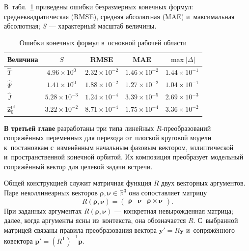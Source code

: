 В~табл.~\ref{tab:syn-main-errors} приведены ошибки безразмерных конечных формул: среднеквадратическая (RMSE), средняя абсолютная (MAE) и~максимальная абсолютная; $S$ --- характерный масштаб величины.

\begin{table}[htbp]
    \centering
    \caption{Ошибки конечных формул в~основной рабочей области}
    \label{tab:syn-main-errors}
    \small
    \begin{tabular}{@{}lcccc@{}}
        \toprule
        Величина & $S$ & RMSE & MAE & $\max|\Delta|$ \\
        \midrule
        $\widehat T$ & $4.96\!\times\!10^{0}$ & $2.32\!\times\!10^{-2}$ & $1.46\!\times\!10^{-2}$ & $1.44\!\times\!10^{-1}$ \\
        $\widehat\Psi$ & $1.41\!\times\!10^{0}$ & $1.88\!\times\!10^{-2}$ & $1.27\!\times\!10^{-2}$ & $1.04\!\times\!10^{-1}$ \\
        $\widehat J$ & $5.28\!\times\!10^{-3}$ & $1.24\!\times\!10^{-4}$ & $3.39\!\times\!10^{-5}$ & $2.69\!\times\!10^{-3}$ \\
        $\widehat{\mathbf z}_0^{\mathrm{pl}}$ & $3.22\!\times\!10^{-2}$ & $8.71\!\times\!10^{-4}$ & $1.75\!\times\!10^{-4}$ & $3.36\!\times\!10^{-2}$ \\
        \bottomrule
    \end{tabular}
\end{table}

\FloatBarrier
\noindent\textbf{В третьей главе} разработаны три типа линейных $R$-преобразований сопряжённых переменных для перехода от~плоской круговой модели к~постановкам с~изменённым начальным фазовым вектором, эллиптической и~пространственной конечной орбитой. Их композиция преобразует модельный сопряжённый вектор для целевой задачи встречи.

Общей конструкцией служит матричная функция $R$ двух векторных аргументов. Паре неколлинеарных векторов $\boldsymbol\rho,\boldsymbol\nu\in\mathbb R^3$ она сопоставляет матрицу
\begin{equation}
    R(\boldsymbol\rho,\boldsymbol\nu)=
    \begin{pmatrix}\boldsymbol\rho&\boldsymbol\nu&\boldsymbol\rho\times\boldsymbol\nu\end{pmatrix}.
    \label{eq:syn-r-general}
\end{equation}
При заданных аргументах $R(\boldsymbol\rho,\boldsymbol\nu)$ --- конкретная невырожденная матрица; далее, когда аргументы ясны из~контекста, она обозначается $R$. С~выбранной матрицей связаны правила преобразования вектора $\mathbf y'=R\mathbf y$ и~сопряжённого ковектора $\mathbf p'=(R^{\mathsf T})^{-1}\mathbf p$.

